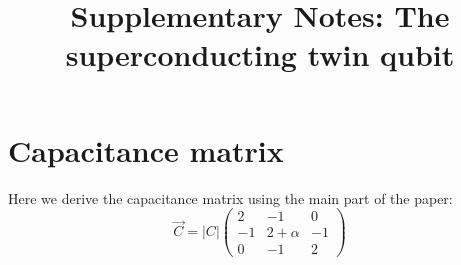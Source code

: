 \documentclass[%
superscriptaddress,
preprint,
preprintnumbers,
bibnotes,
amsmath,
amssymb,
aps,
showkeys,
prb,
]{revtex4-2}
\newcommand{\iket}[1]{\ensuremath{\Ket{#1}}}
\newcommand{\iketbra}[2]{\ket{#1}\bra{#2}}
\newcommand{\iabsSquared}[1]{\ensuremath{\left|#1\right|^2}}
\newcommand{\iabs}[1]{\ensuremath{\left|#1\right|}}
\begin{document}
\title{Supplementary Notes: The superconducting twin qubit}






\section{Capacitance matrix}
\label{sec:capacitance-matrix}

\begin{framed}\noindent
  Here we derive the capacitance matrix using the main part of the paper:
  \begin{equation}
\vec{C} =  \iabs{C} \begin{pmatrix}
      2 & -1 & 0\\
      -1 & 2 + \alpha & -1\\
      0 & -1 & 2
    \end{pmatrix}
  \end{equation}

\end{framed}
\end{document}
